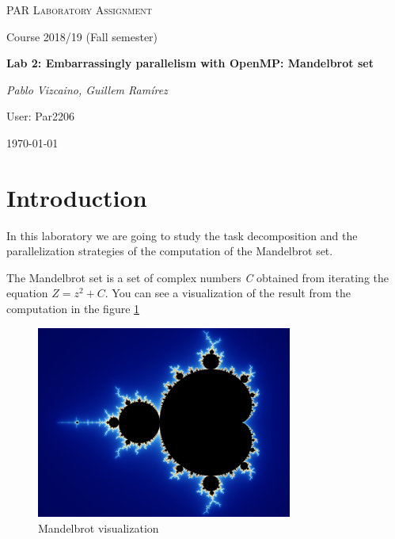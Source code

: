 \documentclass{article}
\begin{document}
\begin{titlepage}
	\centering
	\vspace{1cm}
	{\scshape\Large PAR Laboratory Assignment\par}
	\vspace{0.75cm}
	{\Large Course 2018/19 (Fall semester)\par}
	\vspace{0.75cm}
	{\huge\bfseries Lab 2:  Embarrassingly parallelism with OpenMP: Mandelbrot set\par}
	\vspace{1cm}
	{\Large\itshape Pablo Vizcaino, Guillem Ramírez\par}
    \vspace{0.5cm}
    {\Large User: Par2206\par}
    \vfill
	{\large \today\par}
\end{titlepage}

 
\clearpage
\tableofcontents
\clearpage 

\section{Introduction}
\justify
In this laboratory we are going to study the task decomposition and the parallelization strategies of the computation of the Mandelbrot set.


\justify
The Mandelbrot set is a set of complex numbers \textit{C} obtained from iterating the equation $Z = z^2 + C$.
You can see a visualization of the result from the computation in the figure \ref{fig:mandelbrot1}


\begin{figure}[ht]
    \centering
    \includegraphics[width=0.75\textwidth]{mandelbrot.jpg}
    \caption{Mandelbrot visualization}
    \label{fig:mandelbrot1}
\end{figure}
\newpage
\end{document}
